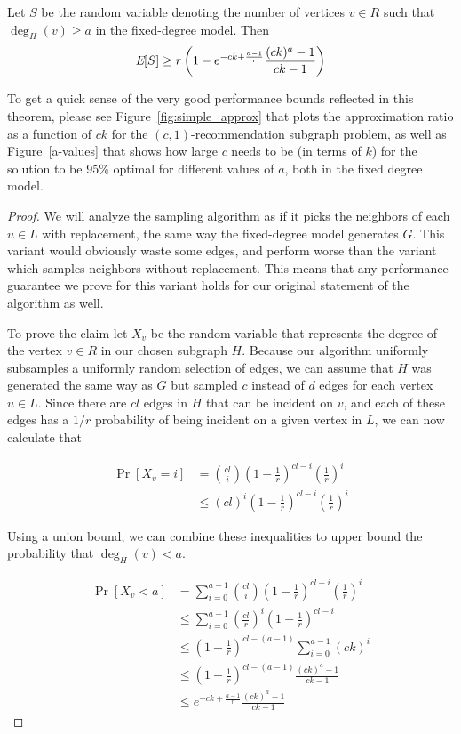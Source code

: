 \begin{thm}\label{original_result}
Let $S$ be the
random variable denoting the number of vertices $v \in R$ such that
$\deg_{H}(v)\geq a$ in the fixed-degree model. Then
\[ \emph{\text{E}}[S] \geq r\left(1-e^{-ck+\frac{a-1}{r}}\frac{(ck)^a-1}{ck-1}\right)  \]
\end{thm}

To get a quick sense of the very good performance bounds reflected in this theorem, please see Figure~\ref{fig:simple_approx} that plots the approximation ratio as a function of $ck$ for the $(c,1)$-recommendation subgraph problem, as well as Figure~\ref{a-values} that shows how large $c$ needs to be (in terms of $k$) for the
solution to be 95\% optimal for different values of $a$, both in the fixed degree model.\vs

\begin{proof}
We will analyze the sampling algorithm as if it picks the neighbors of
each $u\in L$ with replacement, the same way the fixed-degree model
generates $G$. This variant would obviously waste some edges, and perform
worse than the variant which samples neighbors without replacement. This
means that any performance guarantee we prove for this variant holds
for our original statement of the algorithm as well. \vs

To prove the claim let $X_{v}$ be the random variable that represents
the degree of the vertex $v\in R$ in our chosen subgraph $H$. Because our
algorithm uniformly subsamples a uniformly random selection of edges,
we can assume that $H$ was generated the same way as $G$ but sampled $c$
instead of $d$ edges for each vertex $u\in L$. Since there are $cl$
edges in $H$ that can be incident on $v$, and each of these edges has a
$1/r$ probability of being incident on a given vertex in $L$, we can now
calculate that

\begin{align*}
      \Pr[X_v = i]
&=    \binom{cl}{i} (1-\frac{1}{r})^{cl-i} \left(\frac{1}{r}\right)^i \\
&\leq (cl)^i (1-\frac{1}{r})^{cl-i} \left(\frac{1}{r}\right)^i
\end{align*}

Using a union bound, we can combine these inequalities to upper bound
the probability that $\deg_H(v)<a$.

\begin{align*}
      \Pr[X_v < a]
&=    \sum_{i=0}^{a-1} \binom{cl}{i} \left(1-\frac{1}{r}\right)^{cl-i}\left(\frac{1}{r}\right)^i \\
&\leq \sum_{i=0}^{a-1} \left(\frac{cl}{r}\right)^i\left(1-\frac{1}{r}\right)^{cl-i} \\
&\leq    \left(1-\frac{1}{r}\right)^{cl-(a-1)} \sum_{i=0}^{a-1} (ck)^i \\
&\leq \left(1-\frac{1}{r}\right)^{cl-(a-1)}\frac{(ck)^a-1}{ck-1} \\
&\leq e^{-ck+\frac{a-1}{r}} \frac{(ck)^a-1}{ck-1}
\end{align*}


\end{proof}
